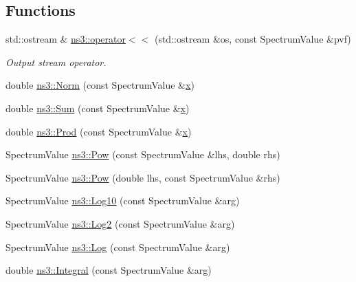 \subsection*{Functions}
\begin{DoxyCompactItemize}
\item 
std\+::ostream \& \hyperlink{namespacens3_a1e898cfd2c2fed3fdbd465a5c1b9f69d}{ns3\+::operator$<$$<$} (std\+::ostream \&os, const Spectrum\+Value \&pvf)
\begin{DoxyCompactList}\small\item\em Output stream operator. \end{DoxyCompactList}\item 
double \hyperlink{namespacens3_a929727240faf05726072f417f657f654}{ns3\+::\+Norm} (const Spectrum\+Value \&\hyperlink{lte__link__budget__x2__handover__measures_8m_a9336ebf25087d91c818ee6e9ec29f8c1}{x})
\item 
double \hyperlink{namespacens3_afad5475661952172fe6ef1260360dad8}{ns3\+::\+Sum} (const Spectrum\+Value \&\hyperlink{lte__link__budget__x2__handover__measures_8m_a9336ebf25087d91c818ee6e9ec29f8c1}{x})
\item 
double \hyperlink{namespacens3_ada030e93e711d4b9ea379c57cf0c5e4b}{ns3\+::\+Prod} (const Spectrum\+Value \&\hyperlink{lte__link__budget__x2__handover__measures_8m_a9336ebf25087d91c818ee6e9ec29f8c1}{x})
\item 
Spectrum\+Value \hyperlink{namespacens3_a263efa70f571fbc6d8b13f838cb9f220}{ns3\+::\+Pow} (const Spectrum\+Value \&lhs, double rhs)
\item 
Spectrum\+Value \hyperlink{namespacens3_a3133a629dbd335c8151508cc8b1046f5}{ns3\+::\+Pow} (double lhs, const Spectrum\+Value \&rhs)
\item 
Spectrum\+Value \hyperlink{namespacens3_a852286d6b0f3471ea9fed2ec66bd4536}{ns3\+::\+Log10} (const Spectrum\+Value \&arg)
\item 
Spectrum\+Value \hyperlink{namespacens3_a7f903df44671c49879b8d6284024ffd3}{ns3\+::\+Log2} (const Spectrum\+Value \&arg)
\item 
Spectrum\+Value \hyperlink{namespacens3_ad5fc1a2db3d2b2f9f8d158ce63cffbad}{ns3\+::\+Log} (const Spectrum\+Value \&arg)
\item 
double \hyperlink{namespacens3_a3dd3817567502f8bc77b04e47134c070}{ns3\+::\+Integral} (const Spectrum\+Value \&arg)
\end{DoxyCompactItemize}
